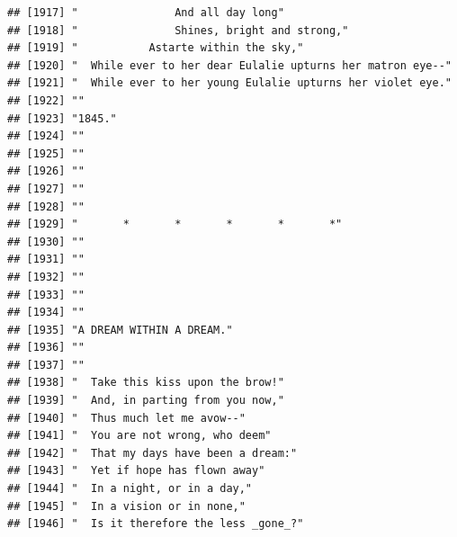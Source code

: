 \documentclass{article}\usepackage[]{graphicx}\usepackage[]{color}
\makeatletter
\newenvironment{kframe}{%
 \def\at@end@of@kframe{}%
 \ifinner\ifhmode%
  \def\at@end@of@kframe{\end{minipage}}%
  \begin{minipage}{\columnwidth}%
 \fi\fi%
 \def\FrameCommand##1{\hskip\@totalleftmargin \hskip-\fboxsep
 \colorbox{shadecolor}{##1}\hskip-\fboxsep
     \hskip-\linewidth \hskip-\@totalleftmargin \hskip\columnwidth}%
 \MakeFramed {\advance\hsize-\width
   \@totalleftmargin\z@ \linewidth\hsize
   \@setminipage}}%
 {\par\unskip\endMakeFramed%
 \at@end@of@kframe}
\newenvironment{knitrout}{}{} %
\makeatother
\begin{document}
\begin{knitrout}
\begin{kframe}
\begin{verbatim}
## [1917] "               And all day long"                                             
## [1918] "               Shines, bright and strong,"                                   
## [1919] "           Astarte within the sky,"                                          
## [1920] "  While ever to her dear Eulalie upturns her matron eye--"                   
## [1921] "  While ever to her young Eulalie upturns her violet eye."                   
## [1922] ""                                                                            
## [1923] "1845."                                                                       
## [1924] ""                                                                            
## [1925] ""                                                                            
## [1926] ""                                                                            
## [1927] ""                                                                            
## [1928] ""                                                                            
## [1929] "       *       *       *       *       *"                                    
## [1930] ""                                                                            
## [1931] ""                                                                            
## [1932] ""                                                                            
## [1933] ""                                                                            
## [1934] ""                                                                            
## [1935] "A DREAM WITHIN A DREAM."                                                     
## [1936] ""                                                                            
## [1937] ""                                                                            
## [1938] "  Take this kiss upon the brow!"                                             
## [1939] "  And, in parting from you now,"                                             
## [1940] "  Thus much let me avow--"                                                   
## [1941] "  You are not wrong, who deem"                                               
## [1942] "  That my days have been a dream:"                                           
## [1943] "  Yet if hope has flown away"                                                
## [1944] "  In a night, or in a day,"                                                  
## [1945] "  In a vision or in none,"                                                   
## [1946] "  Is it therefore the less _gone_?"                                          

\end{verbatim}
\end{kframe}
\end{knitrout}
\end{document}

